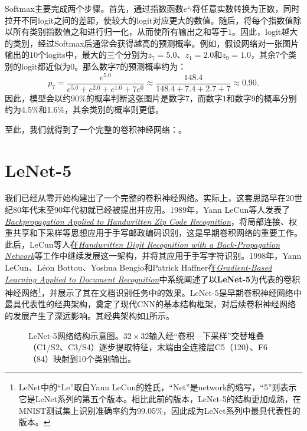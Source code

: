 Softmax主要完成两个步骤。首先，通过指数函数$e^{z_i}$将任意实数转换为正数，同时拉开不同logit之间的差距，使较大的logit对应更大的数值。随后，将每个指数值除以所有类别指数值之和进行归一化，从而使所有输出之和等于$1$。因此，logit越大的类别，经过Softmax后通常会获得越高的预测概率。例如，假设网络对一张图片输出的$10$个logits中，最大的三个分别为$z_7=5.0$、$z_1=2.0$和$z_9=1.0$，其余$7$个类别的logit都近似为$0$。那么数字$7$的预测概率约为：
$$
p_7=\frac{e^{5.0}}{e^{5.0}+e^{2.0}+e^{1.0}+7e^0}\approx\frac{148.4}{148.4+7.4+2.7+7}\approx0.90.
$$
因此，模型会以约$90\%$的概率判断这张图片是数字$7$，而数字$1$和数字$9$的概率分别约为$4.5\%$和$1.6\%$，其余类别的概率则更低。

至此，我们就得到了一个完整的卷积神经网络：。

\section{LeNet-5}

我们已经从零开始构建出了一个完整的卷积神经网络。实际上，这套思路早在20世纪80年代末至90年代初就已经被提出并应用。1989年，Yann LeCun等人发表了\href{http://yann.lecun.com/exdb/publis/pdf/lecun-89e.pdf}{\textit{Backpropagation Applied to Handwritten Zip Code Recognition}}，将局部连接、权重共享和下采样等思想应用于手写邮政编码识别，这是早期卷积网络的重要工作。此后，LeCun等人在\href{http://yann.lecun.com/exdb/publis/pdf/lecun-90c.pdf}{\textit{Handwritten Digit Recognition with a Back-Propagation Network}}等工作中继续发展这一架构，并将其应用于手写字符识别。1998年，Yann LeCun、Léon Bottou、Yoshua Bengio和Patrick Haffner在\href{http://yann.lecun.com/exdb/publis/pdf/lecun-98.pdf}{\textit{Gradient-Based Learning Applied to Document Recognition}}中系统阐述了以\textbf{LeNet-5}为代表的卷积神经网络\footnote{LeNet中的“Le”取自Yann LeCun的姓氏，“Net”是network的缩写，“5”则表示它是LeNet系列的第五个版本。相比此前的版本，LeNet-5的结构更加成熟，在MNIST测试集上识别准确率约为99.05\%，因此成为LeNet系列中最具代表性的版本。}，并展示了其在文档识别任务中的效果。LeNet-5是早期卷积神经网络中最具代表性的经典架构，奠定了现代CNN的基本结构框架，对后续卷积神经网络的发展产生了深远影响。其经典架构如\cref{fig:lenet}所示。

\begin{figure}[H]
    \caption{LeNet-5网络结构示意图。$32\times 32$输入经“卷积—下采样”交替堆叠（C1/S2、C3/S4）逐步提取特征，末端由全连接层C5（120）、F6（84）映射到10个类别输出。}
    \label{fig:lenet}
\end{figure}

